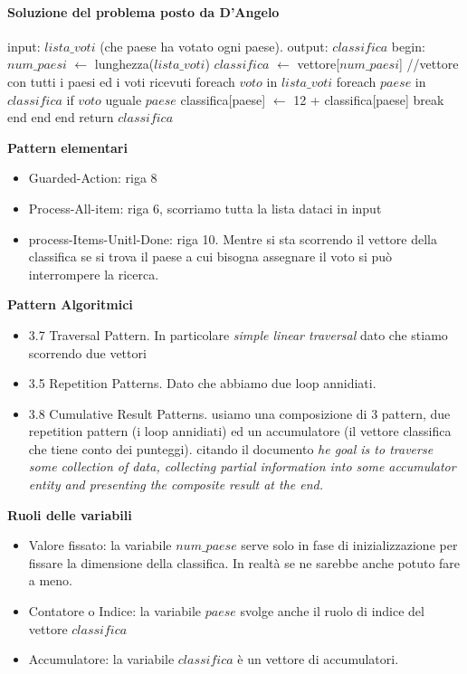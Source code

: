 \documentclass[a4paper]{article}
\begin{document}
\paragraph{Soluzione del problema posto da D'Angelo}

\begin{algorithm}[caption={Calcolo punteggi}, label={alg2}]
	input: $lista\_voti$ (che paese ha votato ogni paese).
	output: $classifica$
	begin:
	$num\_paesi$ $\gets$ lunghezza($lista\_voti$)
	$classifica$ $\gets$ vettore[$num\_paesi$] //vettore con tutti i paesi ed i voti ricevuti
	foreach $voto$ in $lista\_voti$
		foreach $paese$ in $classifica$
			if $voto$ uguale $paese$
				classifica[paese] $\gets$ 12 + classifica[paese]
				break
			end
		end
	end
	return $classifica$
\end{algorithm}

\textbf{Pattern elementari}
\begin{itemize}
	\item Guarded-Action: riga 8
	\item Process-All-item: riga 6, scorriamo tutta la lista dataci in input
	\item process-Items-Unitl-Done: riga 10. Mentre si sta scorrendo il vettore della classifica se si trova il paese a cui bisogna assegnare il voto si può interrompere la ricerca.
\end{itemize}

\textbf{Pattern Algoritmici}
\begin{itemize}
	\item 3.7 Traversal Pattern. In particolare \textit{simple linear traversal} dato che stiamo scorrendo due vettori
	\item 3.5 Repetition Patterns. Dato che abbiamo due loop annidiati.
	\item 3.8 Cumulative Result Patterns. usiamo una composizione di 3 pattern, due repetition pattern (i loop annidiati) ed un accumulatore (il vettore classifica che tiene conto dei punteggi). citando il documento \cite{articolo} \textit{he goal is to traverse some collection of data, collecting partial information into some accumulator entity and presenting the composite result at the end.}

\end{itemize}
\textbf{Ruoli delle variabili}

\begin{itemize}
	\item Valore fissato: la variabile $num\_paese$ serve solo in fase di inizializzazione per fissare la dimensione della classifica. In realtà se ne sarebbe anche potuto fare a meno.
	\item Contatore o Indice: la variabile $paese$ svolge anche il ruolo di indice del vettore $classifica$
	\item Accumulatore: la variabile $classifica$ è un vettore di accumulatori.
\end{itemize}
\end{document}
